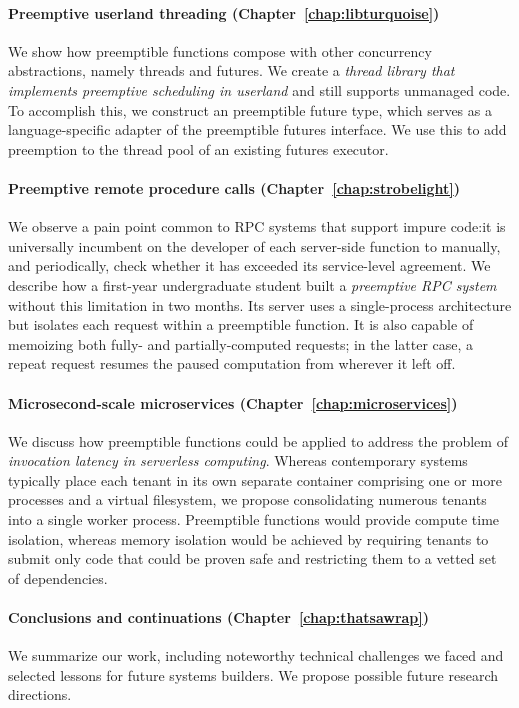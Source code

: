 \paragraph{Preemptive userland threading (Chapter~\ref{chap:libturquoise})}
We show how preemptible functions compose with other concurrency abstractions, namely
threads and futures.  We create a \textit{thread library that implements preemptive
scheduling in userland} and still supports unmanaged code.  To accomplish this, we
construct an preemptible future type, which serves as a language-specific adapter of
the preemptible futures interface.  We use this to add preemption to the thread pool
of an existing futures executor.

\paragraph{Preemptive remote procedure calls (Chapter~\ref{chap:strobelight})}
We observe a pain point common to RPC systems that support impure code:\@ it is
universally incumbent on the developer of each server-side function to manually, and
periodically, check whether it has exceeded its service-level agreement.  We describe
how a first-year undergraduate student built a \textit{preemptive RPC system} without
this limitation in two months.  Its server uses a single-process architecture but
isolates each request within a preemptible function.  It is also capable of memoizing
both fully- and partially-computed requests; in the latter case, a repeat request
resumes the paused computation from wherever it left off.

\paragraph{Microsecond-scale microservices (Chapter~\ref{chap:microservices})}
We discuss how preemptible functions could be applied to address the problem of
\textit{invocation latency in serverless computing}.  Whereas contemporary systems
typically
place each tenant in its own separate container comprising one or more processes and
a virtual filesystem, we propose consolidating numerous tenants into a single worker
process.  Preemptible functions would provide compute time isolation, whereas memory
isolation would be achieved by requiring tenants to submit only code that could be
proven safe and restricting them to a vetted set of dependencies.

\paragraph{Conclusions and continuations (Chapter~\ref{chap:thatsawrap})}
We summarize our work, including noteworthy technical challenges we faced and
selected lessons for future systems builders.  We propose possible future research
directions.
